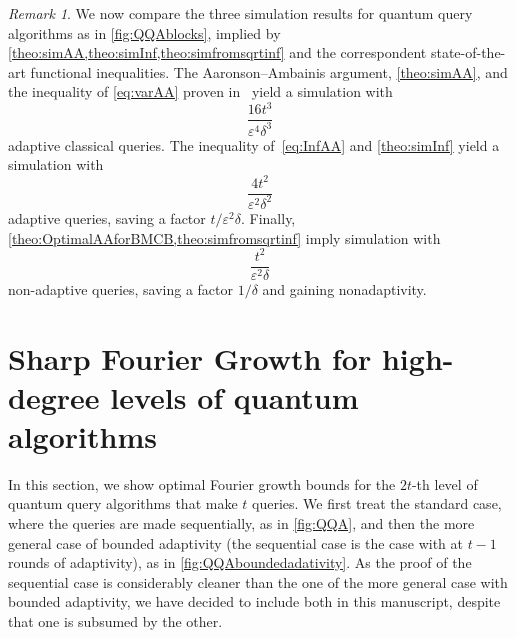 \documentclass[11pt]{article}
\newcommand{\1}{\mathbf{1}}
\newcommand{\eps}{\varepsilon}
\theoremstyle{plain}
\theoremstyle{definition}
\theoremstyle{remark}
\newtheorem{remark}[theorem]{Remark}
\begin{document}
\begin{remark}\label{rem:comparison}
    We now compare the three simulation results for quantum query algorithms as in \cref{fig:QQAblocks}, implied by \cref{theo:simAA,theo:simInf,theo:simfromsqrtinf} and the correspondent state-of-the-art functional inequalities. The Aaronson--Ambainis argument, \cref{theo:simAA}, and the inequality of \cref{eq:varAA} proven in~\cite{gutierrez2023influences} yield a simulation with 
    \begin{equation*}
        \frac{16t^3}{\eps^4\delta^3}
    \end{equation*}
    adaptive classical queries. The inequality of~\cref{eq:InfAA} and \cref{theo:simInf} yield a simulation with 
    \begin{equation*}
        \frac{4t^2}{\eps^2\delta^2}
    \end{equation*}
    adaptive queries, saving a factor $t/\eps^2\delta.$ Finally, \cref{theo:OptimalAAforBMCB,theo:simfromsqrtinf} imply simulation with 
    \begin{equation*}
        \frac{t^2}{\eps^2\delta}
    \end{equation*}
    non-adaptive queries, saving a factor $1/\delta$ and gaining nonadaptivity. 
\end{remark}




\section{Sharp Fourier Growth for high-degree levels of quantum algorithms}
In this section, we show optimal Fourier growth bounds for the $2t$-th level of quantum query algorithms that make $t$ queries. We first treat the standard case, where the queries are made sequentially, as in \cref{fig:QQA}, and then the more general case of bounded adaptivity  (the sequential case is the case with at $t-1$ rounds of adaptivity), as in \cref{fig:QQAboundedadativity}. As the proof of the sequential case is considerably cleaner than the one of the more general case with bounded adaptivity, we have decided to include both in this manuscript, despite that one is subsumed by the other. 
\end{document}
